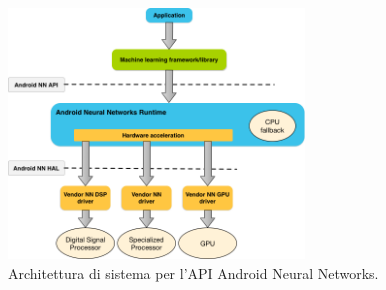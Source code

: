 \begin{figure}[ht]
    \centering
    \includegraphics[width=0.7\textwidth]{Immagini/nnapi_architecture.png}
    \caption{Architettura di sistema per l'API Android Neural Networks.}
    \label{fig:nnapiArchitecture}
\end{figure}


